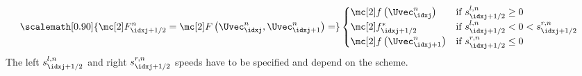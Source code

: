 \begin{defnbox}\nospacing
    \begin{defn}\label{defn:central_flux_non_linear_systems}\leavevmode\\
            \begin{align*}
              \scalemath[0.90]{\Flux_{\idxj+1/2}^{n}=\Flux \left(\Uvec_{\idxj}^{n},\Uvec_{\idxj+1}^{n}\right)=}&
              \begin{cases}
                \flux\left(\Uvec_{\idxj}^{n}\right)&\text{if }s_{\idxj+1/2}^{l,n}\geq0\\
                \flux^{*}_{\idxj+1/2}&\text{if }s_{\idxj+1/2}^{l,n}<0<s_{\idxj+1/2}^{r,n}\\
                \flux\left(\Uvec_{\idxj+1}^{n}\right)&\text{if }s_{\idxj+1/2}^{r,n}\leq0
              \end{cases}
            \end{align*}
      The left $s^{l,n}_{\idxj+1/2}$ and right $s^{r,n}_{\idxj+1/2}$ speeds have to be specified and depend on the scheme.
      \begin{figure}[H]
          \centering{
            \def\svgwidth{130pt}
            \resizebox{0.6\linewidth}{!}{
              }
          }
      \end{figure}
    \end{defn}
\end{defnbox}
